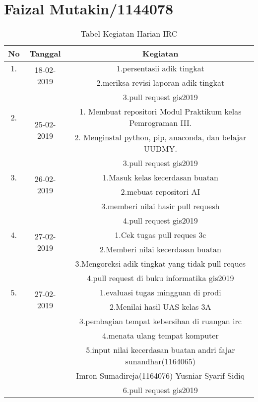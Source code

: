 \chapter{Faizal Mutakin/1144078}
\begin{table}[h]
\caption{Tabel Kegiatan Harian IRC}
\centering
\begin{tabular}{|c|c|c|}
\hline
No&Tanggal&Kegiatan\\
\hline
1.&\multirow{2}{*}{18-02-2019}&1.persentasii adik tingkat\\
&&2.meriksa revisi laporan adik tingkat\\
&&3.pull request gis2019\\
\hline
2.&\multirow{2}{*}{25-02-2019}&1. Membuat repositori Modul Praktikum kelas Pemrograman III.\\
&&2. Menginstal python, pip, anaconda, dan belajar UUDMY.\\
&&3.pull request gis2019\\
\hline
3.&\multirow{2}{*}{26-02-2019}&1.Masuk kelas kecerdasan buatan\\
&&2.mebuat repositori AI\\
&&3.memberi nilai hasir pull requesh\\
&&4.pull request gis2019\\
\hline
4.&\multirow{2}{*}{27-02-2019}&1.Cek tugas pull reques 3c\\
&&2.Memberi nilai kecerdasan buatan\\
&&3.Mengoreksi adik tingkat yang tidak pull reques\\
&&4.pull request di buku informatika gis2019\\
\hline
5.&\multirow{2}{*}{27-02-2019}&1.evaluasi tugas mingguan di prodi\\
&&2.Menilai hasil UAS kelas 3A\\
&&3.pembagian tempat kebersihan di ruangan irc\\
&&4.menata ulang tempat komputer\\
&&5.input nilai kecerdasan buatan andri fajar sunandhar(1164065)\\
&& Imron Sumadireja(1164076) Yusniar Syarif Sidiq \\
&&6.pull request gis2019\\
\hline
\end{tabular}
\label{table:contoh}
\end{table}
